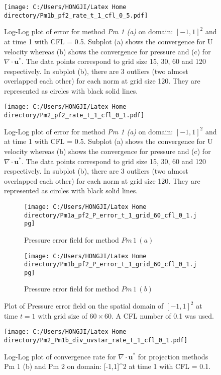 \begin{figure}[H]
	\centering
	\texttt{[image: C:/Users/HONGJI/Latex Home directory/Pm1b\_pf2\_rate\_t\_1\_cfl\_0\_5.pdf]}
	\caption{Log-Log plot of error for method \textit{Pm 1 (a)} on domain: $[-1,1]^2$ and at time 1 with CFL = 0.5. Subplot (a) shows the convergence for U velocity whereas (b) shows the convergence for pressure and (c) for $\nabla \cdot \textbf{u}^*$. The data points correspond to grid size 15, 30, 60 and 120 respectively. In subplot (b), there are 3 outliers (two almost overlapped each other) for each norm at grid size 120. They are represented as circles with black solid lines.}\label{fig:6.5}
\end{figure}

\begin{figure}[H]
	\centering
	\texttt{[image: C:/Users/HONGJI/Latex Home directory/Pm2\_pf2\_rate\_t\_1\_cfl\_0\_1.pdf]}
	\caption{Log-Log plot of error for method \textit{Pm 1 (a)} on domain: $[-1,1]^2$ and at time 1 with CFL = 0.5. Subplot (a) shows the convergence for U velocity whereas (b) shows the convergence for pressure and (c) for $\nabla \cdot \textbf{u}^*$. The data points correspond to grid size 15, 30, 60 and 120 respectively. In subplot (b), there are 3 outliers (two almost overlapped each other) for each norm at grid size 120. They are represented as circles with black solid lines.}\label{fig:6.6}
\end{figure}

\begin{figure}[H]
	\centering
	\begin{subfigure}[t]{2.5in}
		\centering
		\texttt{[image: C:/Users/HONGJI/Latex Home directory/Pm1a\_pf2\_P\_error\_t\_1\_grid\_60\_cfl\_0\_1.jpg]}
		\caption{Pressure error field for method $Pm\,1\,(a)$}\label{fig:6.7a}		
	\end{subfigure}
	\quad
	\begin{subfigure}[t]{2.5in}
		\centering
		\texttt{[image: C:/Users/HONGJI/Latex Home directory/Pm1b\_pf2\_P\_error\_t\_1\_grid\_60\_cfl\_0\_1.jpg]}
		\caption{Pressure error field for method $Pm\,1\,(b)$}\label{fig:6.7b}
	\end{subfigure}
	\caption{Plot of Pressure error field on the spatial domain of $[-1,1]^2$ at time $t=1$ with grid size of $60 \times 60$. A CFL number of 0.1 was used.}\label{fig:6.7}
\end{figure}

\begin{figure}[H]
	\centering
	\texttt{[image: C:/Users/HONGJI/Latex Home directory/Pm2\_Pm1b\_div\_uvstar\_rate\_t\_1\_cfl\_0\_1.pdf]}
	\caption{Log-Log plot of convergence rate for $\nabla \cdot \textbf{u}^*$ for projection methods Pm 1 (b) and Pm 2 on domain: [-1,1]^2 at time 1 with CFL = 0.1. }\label{fig:6.8}
\end{figure}

